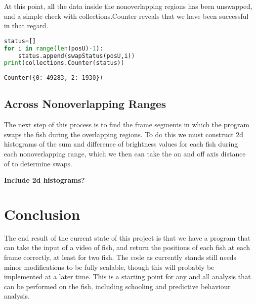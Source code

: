 \documentclass[12pt]{article}
\begin{document}
At this point, all the data inside the nonoverlapping regions has been unswapped, and a simple check with collections.Counter reveals that we have been successful in that regard.
\begin{lstlisting}[language=Python]
status=[]
for i in range(len(posU)-1):
    status.append(swapStatus(posU,i))
print(collections.Counter(status))
\end{lstlisting}
\begin{verbatim}
Counter({0: 49283, 2: 1930})
\end{verbatim}

\subsection{Across Nonoverlapping Ranges}
The next step of this process is to find the frame segments in which the program swaps the fish during the overlapping regions. To do this we must construct 2d histograms of the sum and difference of brightness values for each fish during each nonoverlapping range, which we then can take the on and off axis distance of to determine swaps.

\textbf{Include 2d histograms?}

\section{Conclusion}

The end result of the current state of this project is that we have a program that can take the input of a video of fish, and return the positions of each fish at each frame correctly, at least for two fish. The code as currently stands still needs minor modifications to be fully scalable, though this will probably be implemented at a later time. This is a starting point for any and all analysis that can be performed on the fish, including schooling and predictive behaviour analysis.
\end{document}
